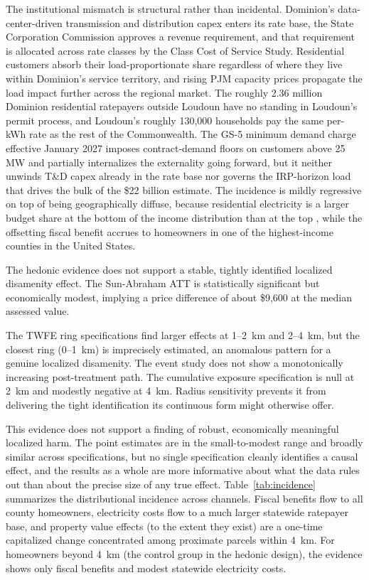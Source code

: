 \documentclass[12pt]{article}
\begin{document}
The institutional mismatch is structural rather than incidental. Dominion's data-center-driven transmission and distribution capex enters its rate base, the State Corporation Commission approves a revenue requirement, and that requirement is allocated across rate classes by the Class Cost of Service Study. Residential customers absorb their load-proportionate share regardless of where they live within Dominion's service territory, and rising PJM capacity prices propagate the load impact further across the regional market. The roughly 2.36 million Dominion residential ratepayers outside Loudoun have no standing in Loudoun's permit process, and Loudoun's roughly 130,000 households pay the same per-kWh rate as the rest of the Commonwealth. The GS-5 minimum demand charge effective January 2027 imposes contract-demand floors on customers above 25 MW and partially internalizes the externality going forward, but it neither unwinds T\&D capex already in the rate base nor governs the IRP-horizon load that drives the bulk of the \$22 billion estimate. The incidence is mildly regressive on top of being geographically diffuse, because residential electricity is a larger budget share at the bottom of the income distribution than at the top \citep{Borenstein2012}, while the offsetting fiscal benefit accrues to homeowners in one of the highest-income counties in the United States.

The hedonic evidence does not support a stable, tightly identified localized disamenity effect. The Sun-Abraham ATT is statistically significant but economically modest, implying a price difference of about \$9,600 at the median assessed value.

The TWFE ring specifications find larger effects at 1--2~km and 2--4~km, but the closest ring (0--1~km) is imprecisely estimated, an anomalous pattern for a genuine localized disamenity. The event study does not show a monotonically increasing post-treatment path. The cumulative exposure specification is null at 2~km and modestly negative at 4~km. Radius sensitivity prevents it from delivering the tight identification its continuous form might otherwise offer.

This evidence does not support a finding of robust, economically meaningful localized harm. The point estimates are in the small-to-modest range and broadly similar across specifications, but no single specification cleanly identifies a causal effect, and the results as a whole are more informative about what the data rules out than about the precise size of any true effect. Table~\ref{tab:incidence} summarizes the distributional incidence across channels. Fiscal benefits flow to all county homeowners, electricity costs flow to a much larger statewide ratepayer base, and property value effects (to the extent they exist) are a one-time capitalized change concentrated among proximate parcels within 4~km. For homeowners beyond 4~km (the control group in the hedonic design), the evidence shows only fiscal benefits and modest statewide electricity costs.
\end{document}
